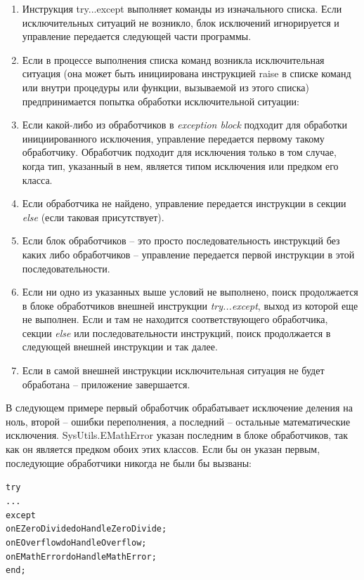 \documentclass{beamer}
\begin{document}
\begin{frame}
\begin{enumerate}
\item Инструкция try...except выполняет команды из изначального списка. Если исключительных ситуаций не возникло, блок исключений игнорируется и управление передается следующей части программы.
\item Если в процессе выполнения списка команд возникла исключительная ситуация (она может быть инициирована инструкцией raise в списке команд или внутри процедуры или функции, вызываемой из этого списка) предпринимается попытка обработки исключительной ситуации:
\item Если какой-либо из обработчиков в \textit{exception block} подходит для обработки инициированного исключения, управление передается первому такому обработчику. Обработчик подходит для исключения только в том случае, когда тип, указанный в нем, является типом исключения или предком его класса.
\item Если обработчика не найдено, управление передается инструкции в секции \textit{else} (если таковая присутствует).
\end{enumerate}
\end{frame}

\begin{frame}
\begin{enumerate}
\setcounter{enumi}{4}
\item Если блок обработчиков – это просто последовательность инструкций без каких либо обработчиков – управление передается первой инструкции в этой последовательности.
\item Если ни одно из указанных выше условий не выполнено, поиск продолжается в блоке обработчиков внешней инструкции \textit{try...except}, выход из которой еще не выполнен. Если и там не находится соответствующего обработчика, секции \textit{else} или последовательности инструкций, поиск продолжается в следующей внешней инструкции и так далее. 
\item Если в самой внешней инструкции исключительная ситуация не будет обработана – приложение завершается.
\end{enumerate}
\end{frame}

\begin{frame}[fragile]
В следующем примере первый обработчик обрабатывает исключение деления на ноль, второй – ошибки переполнения, а последний – остальные математические исключения. SysUtils.EMathError указан последним в блоке обработчиков, так как он является предком обоих этих классов. Если бы он указан первым, последующие обработчики никогда не были бы вызваны:
\begin{alltt}
try
  ...
except
  on EZeroDivide do HandleZeroDivide;
  on EOverflow do HandleOverflow;
  on EMathError do HandleMathError;
end;
\end{alltt}
\end{frame}
\end{document}

